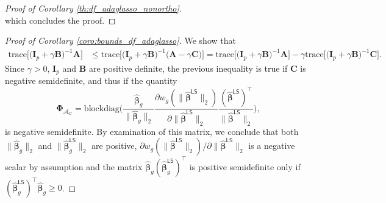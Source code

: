 \documentclass[a4paper, 12pt]{article}
\newcommand{\Aset}{\mathcal{A}}
\newcommand{\trace}{\mathrm{trace}}
\newcommand{\T}{\top}
\def\bbeta{\boldsymbol{\beta}}
\def\bPhi{\boldsymbol{\Phi}}
\def\bA{\mathbf{A}}
\def\bB{\mathbf{B}}
\def\bC{\mathbf{C}}
\def\bI{\mathbf{I}}
\begin{document}
\begin{appendix}
\begin{proof}[Proof of Corollary \ref{th:df_adaglasso_nonortho}]
\begin{equation*}
\end{equation*}
which concludes the proof.
\end{proof}
%
\begin{proof}[Proof of Corollary \ref{coro:bounds_df_adaglasso}]
We show that
\begin{align*}
\trace \big[\big( \bI_p + \gamma \bB\big)^{-1} \bA\big] &\leq \trace \big[\big( \bI_p + \gamma \bB\big)^{-1} \big(\bA - \gamma \bC \big)\big]=\trace \big[\big( \bI_p + \gamma \bB\big)^{-1} \bA \big] - \gamma \trace \big[\big( \bI_p + \gamma \bB\big)^{-1} \bC \big].
\end{align*}
Since $\gamma > 0$, $\bI_p$ and $\bB$ are positive definite, the previous inequality is true if $\bC$ is negative semidefinite, and thus if the quantity
\begin{equation*}
\bPhi_{\Aset_G} = \mathrm{blockdiag} \bigg(  \frac{\widehat{\bbeta}_g}{\lVert \widehat{\bbeta}_g \rVert_2 } \frac{\partial w_g(\lVert \widehat{\bbeta}^\mathsf{LS}\rVert_2)}{\partial \lVert\widehat{\bbeta}^\mathsf{LS} \rVert_2}\frac{(\widehat{\bbeta}^\mathsf{LS})^{\T}}{\lVert \widehat{\bbeta}^\mathsf{LS} \rVert_2}\bigg),
\end{equation*}
is negative semidefinite. By examination of this matrix, we conclude that both $\lVert\widehat{\bbeta}_g \rVert_2$ and $\lVert\widehat{\bbeta}_{g}^{\mathsf{LS}}\rVert_2$ are positive, $\partial w_g(\lVert \widehat{\bbeta}^\mathsf{LS}\rVert_2) / \partial \lVert\widehat{\bbeta}^\mathsf{LS} \rVert_2 $ is a negative scalar by assumption and the matrix $\widehat{\bbeta}_g(\widehat{\bbeta}_{g}^{\mathsf{LS}})^{\T}$ is positive semidefinite only if $(\widehat{\bbeta}_{g}^{\mathsf{LS}})^{\T}\widehat{\bbeta}_g \geq 0$.
\end{proof}


\end{appendix}

\bigskip 

 
 

%                                                  
%                                                                                               
%
%
%
%
%
\end{document}

